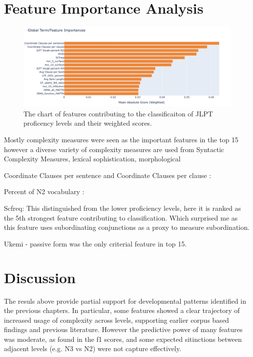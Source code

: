 \section{Feature Importance Analysis}
\begin{figure}[h!]
    \centering
    \includegraphics[scale=.4]{img/feature_importance}
    \caption{The chart of features contributing to the classificaiton of JLPT proficency levels and their weighted scores.}
    \label{fig:featureimportance}
\end{figure}

Mostly complexity measures were seen as the important features in the top 15 however a diverse variety of complexity
measures are used from Syntactic Complexity Measures, lexical sophistication, morphological

Coordinate Clauses per sentence and Coordinate Clauses per clause :

Percent of N2 vocabulary :

Scfreq: This distinguished from the lower proficiency levels, here it is ranked as the 5th strongest feature
contributing to classification. Which surprised me as this feature uses subordinating conjunctions as a proxy to
measure subordination.

Ukemi - passive form was the only criterial feature in top 15.


\section{Discussion}

The resuls above provide partial support for developmental patterns identified in the previous chapters. In
particular, some features showed a clear trajectory of increased usage of complexity across levels, supporting
earlier corpus based findings and previous literature. However the predictive power of many features was moderate,
as found in the f1 scores, and some expected sitinctions between adjacent levels (e.g. N3 vs N2) were not capture
effectively.

